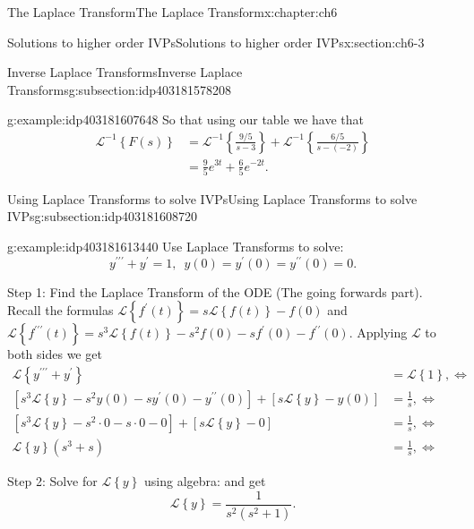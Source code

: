 \documentclass[oneside,10pt,]{book}
\numberwithin{equation}{section}
\numberwithin{equation}{section}
\newcommand{\amp}{&}
\begin{document}
\begin{chapterptx}{The Laplace Transform}{}{The Laplace Transform}{}{}{x:chapter:ch6}
\begin{sectionptx}{Solutions to higher order IVPs}{}{Solutions to higher order IVPs}{}{}{x:section:ch6-3}
\begin{subsectionptx}{Inverse Laplace Transforms}{}{Inverse Laplace Transforms}{}{}{g:subsection:idp403181578208}
\begin{example}{}{g:example:idp403181607648}
So that using our table we have that%
\begin{align*}
\mathcal{L}^{-1}\left\{ F(s)\right\}  \amp =\mathcal{L}^{-1}\left\{ \frac{9/5}{s-3}\right\} +\mathcal{L}^{-1}\left\{ \frac{6/5}{s-(-2)}\right\} \\
\amp =\frac{9}{5}e^{3t}+\frac{6}{5}e^{-2t}.
\end{align*}
%
\end{example}
\end{subsectionptx}
%
%
\typeout{************************************************}
\typeout{************************************************}
%
\begin{subsectionptx}{Using Laplace Transforms to solve IVPs}{}{Using Laplace Transforms to solve IVPs}{}{}{g:subsection:idp403181608720}
\begin{example}{}{g:example:idp403181613440}%
Use Laplace Transforms to solve:%
\begin{equation*}
y^{\prime\prime\prime}+y^{\prime}=1,\,\,\,y(0)=y^{\prime}(0)=y^{\prime\prime}(0)=0.
\end{equation*}
%
\par
Step 1: Find the Laplace Transform of the ODE (The going forwards part). Recall the formulas \(\mathcal{L}\left\{ f^{\prime}(t)\right\} =s\mathcal{L}\left\{ f(t)\right\} -f(0)\) and \(\mathcal{L}\left\{ f^{\prime\prime\prime}(t)\right\} =s^{3}\mathcal{L}\left\{ f(t)\right\} -s^{2}f(0)-sf^{\prime}(0)-f^{\prime\prime}(0)\). Applying \(\mathcal{L}\) to both sides we get%
\begin{align*}
\mathcal{L}\left\{ y^{\prime\prime\prime}+y^{\prime}\right\}  \amp =\mathcal{L}\left\{ 1\right\} ,\iff\\
\left[s^{3}\mathcal{L}\left\{ y\right\} -s^{2}y(0)-sy^{\prime}(0)-y^{\prime\prime}(0)\right]+\left[s\mathcal{L}\left\{ y\right\} -y(0)\right] \amp =\frac{1}{s},\iff\\
\left[s^{3}\mathcal{L}\left\{ y\right\} -s^{2}\cdot0-s\cdot0-0\right]+\left[s\mathcal{L}\left\{ y\right\} -0\right] \amp =\frac{1}{s},\iff\\
\mathcal{L}\left\{ y\right\} \left(s^{3}+s\right) \amp =\frac{1}{s},\iff
\end{align*}
%
\par
Step 2: Solve for \(\mathcal{L}\left\{ y\right\} \) using algebra: and get%
\begin{equation*}
\mathcal{L}\left\{ y\right\} =\frac{1}{s^{2}\left(s^{2}+1\right)}.
\end{equation*}

\end{example}
\end{subsectionptx}
\end{sectionptx}
\end{chapterptx}
\end{document}
